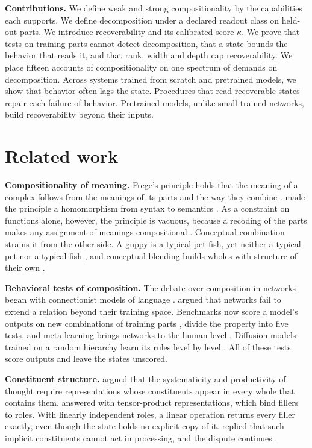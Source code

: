 \textbf{Contributions.} We define weak and strong compositionality by the capabilities each supports. We define decomposition under a declared readout class on held-out parts. We introduce recoverability and its calibrated score $\kappa$. We prove that tests on training parts cannot detect decomposition, that a state bounds the behavior that reads it, and that rank, width and depth cap recoverability. We place fifteen accounts of compositionality on one spectrum of demands on decomposition. Across systems trained from scratch and pretrained models, we show that behavior often lags the state. Procedures that read recoverable states repair each failure of behavior. Pretrained models, unlike small trained networks, build recoverability beyond their inputs.

\section{Related work}
\label{sec:related}

\textbf{Compositionality of meaning.} Frege's principle holds that the meaning of a complex follows from the meanings of its parts and the way they combine \citep{frege1923}. \citet{montague1970} made the principle a homomorphism from syntax to semantics \citep[see][]{janssen1997}. As a constraint on functions alone, however, the principle is vacuous, because a recoding of the parts makes any assignment of meanings compositional \citep{zadrozny1994}. Conceptual combination strains it from the other side. A guppy is a typical pet fish, yet neither a typical pet nor a typical fish \citep{osherson1981}, and conceptual blending builds wholes with structure of their own \citep{fauconnier2002}.

\textbf{Behavioral tests of composition.} The debate over composition in networks began with connectionist models of language \citep{rumelhart1986,pinker1988,elman1990}. \citet{marcus1998} argued that networks fail to extend a relation beyond their training space. Benchmarks now score a model's outputs on new combinations of training parts \citep{lake2018,keysers2020}, \citet{hupkes2020} divide the property into five tests, and meta-learning brings networks to the human level \citep{lake2023}. Diffusion models trained on a random hierarchy learn its rules level by level \citep{favero2025diffusion}. All of these tests score outputs and leave the states unscored.

\textbf{Constituent structure.} \citet{fodor1988} argued that the systematicity and productivity of thought require representations whose constituents appear in every whole that contains them. \citet{smolensky1990} answered with tensor-product representations, which bind fillers to roles. With linearly independent roles, a linear operation returns every filler exactly, even though the state holds no explicit copy of it. \citet{fodor1990} replied that such implicit constituents cannot act in processing, and the dispute continues \citep{goodale2026}.

